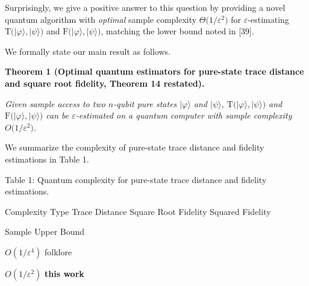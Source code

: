 \documentclass[10pt,a4paper]{article}
\begin{document}
Surprisingly, we give a positive answer to this question by providing a novel quantum algorithm with \emph{optimal} sample complexity $\Theta\lparen 1/\varepsilon^{2}\rparen$ for $\varepsilon$-estimating $\mathrm{T}\lparen\lvert\varphi\rangle,\lvert\psi\rangle\rparen$ and $\mathrm{F}\lparen\lvert\varphi\rangle,\lvert\psi\rangle\rparen$, matching the lower bound noted in [39].\par




We formally state our main result as follows.\par





\par\medskip\noindent\textbf{
\textbf{Theorem 1}\textbf{ }(Optimal quantum estimators for pure-state trace distance and square root fidelity, Theorem 14 restated)\textbf{.}
}\par



\emph{Given sample access to two $n$-qubit pure states $\lvert\varphi\rangle$ and $\lvert\psi\rangle$, $\mathrm{T}\lparen\lvert\varphi\rangle,\lvert\psi\rangle\rparen$ and $\mathrm{F}\lparen\lvert\varphi\rangle,\lvert\psi\rangle\rparen$ can be $\varepsilon$-estimated on a quantum computer with sample complexity $O\lparen 1/\varepsilon^{2}\rparen$.}\par






We summarize the complexity of pure-state trace distance and fidelity estimations in Table 1.\par



Table 1: Quantum complexity for pure-state trace distance and fidelity estimations.




Complexity Type 
Trace Distance 
Square Root Fidelity 
Squared Fidelity 
\par




Sample Upper Bound 





$O(1/\varepsilon^{4})$ folklore 
\par



$O(1/\varepsilon^{2})$\textbf{ this work}
 
\end{document}
